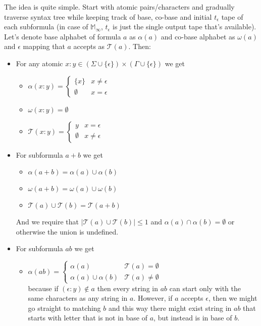 \documentclass[12pt]{article}
\begin{document}
The idea is quite simple. Start with atomic pairs/characters and gradually traverse syntax tree while keeping track of base, co-base and initial $t_\epsilon$ tape of each subformula  (in case of $\mathbb{ M}_\infty$, $t_\epsilon $ is just the single output tape that's available). Let's denote base alphabet of formula $a$ as $\alpha(a)$ and co-base alphabet as $\omega(a)$ and $\epsilon$ mapping that $a$ accepts as $\mathcal{T}(a)$. Then:
\begin{itemize}
	\item For any atomic $x:y\in (\Sigma \cup \{\epsilon\} )\times(\Gamma\cup\{\epsilon\})$ we get 
	\begin{itemize}
		\item $\alpha(x:y) = \begin{cases}
		\{x\} & x\ne\epsilon \\
		\emptyset & x=\epsilon
		\end{cases}$ 
		\item $ \omega(x:y) = \emptyset$
		\item $\mathcal{T}(x:y) = \begin{cases}
		y & x=\epsilon \\
		\emptyset & x\ne \epsilon
		\end{cases}$
	\end{itemize} 
	\item For subformula $a+b$ we get 
	\begin{itemize}
		\item $\alpha(a+b) = \alpha(a) \cup \alpha(b) $
		\item $\omega(a+b) = \omega(a) \cup \omega(b) $
		\item $\mathcal{T}(a) \cup \mathcal{T}(b) = \mathcal{T}(a+b) $ 
	\end{itemize} 
   And we require that $\vert \mathcal{T}(a) \cup \mathcal{T}(b)  \vert \le 1$ and $\alpha(a) \cap \alpha(b) = \emptyset$ or otherwise the union is undefined.
	\item For subformula $ab$ we get
	\begin{itemize}
		\item $\alpha(ab) = \begin{cases}
		\alpha(a) & \mathcal{T}(a)=\emptyset \\
		\alpha(a) \cup \alpha(b) & \mathcal{T}(a)\ne\emptyset
		\end{cases} $ \\
		because if $(\epsilon:y) \notin a$ then every string in $ab$ can start only with the same characters as any string in $a$. However, if $a$ accepts $\epsilon$, then we might go straight to matching $b$ and this way there might exist string in $ab$ that starts with letter that is not in base of $a$, but instead is in base of $b$.

\end{itemize}
\end{itemize}
\end{document}
